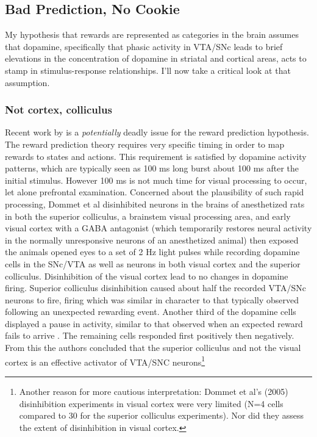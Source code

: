 \documentclass[doc,12pt]{apa}        %
\begin{document}
\subsection{Bad Prediction, No Cookie}
\label{sub:bad}
My hypothesis that rewards are represented as categories in the brain assumes that dopamine, specifically that phasic activity in VTA/SNc leads to brief elevations in the concentration of dopamine in striatal and cortical areas, acts to stamp in stimulus-response relationships.  I'll now take a critical look at that assumption.

\subsubsection{Not cortex, colliculus}
\label{subsub:colliculus}
Recent work by  is a \emph{potentially} deadly issue for the reward prediction hypothesis.  The reward prediction theory requires very specific timing in order to map rewards to states and actions.  This requirement is satisfied by dopamine activity patterns, which are typically seen as 100 ms long burst about 100 ms after the initial stimulus.  However 100 ms is not much time for visual processing to occur, let alone prefrontal examination.  Concerned about the plausibility of such rapid processing, Dommet et al disinhibited neurons in the brains of anesthetized rats in both the superior colliculus, a brainstem visual processing area, and early visual cortex with a GABA antagonist (which temporarily restores neural activity in the normally unresponsive neurons of an anesthetized animal) then exposed the animals opened eyes to a set of 2 Hz light pulses while recording dopamine cells in the SNc/VTA as well as neurons in both visual cortex and the superior colliculus.  Disinhibition of the visual cortex lead to no changes in dopamine firing.  Superior colliculus disinhibition caused about half the recorded  VTA/SNc neurons to fire, firing which was similar in character to that typically observed following an unexpected rewarding event.  Another third of the dopamine cells displayed a pause in activity, similar to that observed when an expected reward fails to arrive \cite{Mirenowicz:1994p7185}.  The remaining cells responded first positively then negatively.  From this the authors concluded that the superior colliculus and not the visual cortex is an effective activator of VTA/SNC neurons\footnote{
    Another reason for more cautious interpretation: Dommet et al's (2005) disinhibition experiments in visual cortex were very limited (N=4 cells compared to 30 for the superior colliculus experiments).  Nor did they assess the extent of disinhibition in visual cortex.
}
\end{document}
